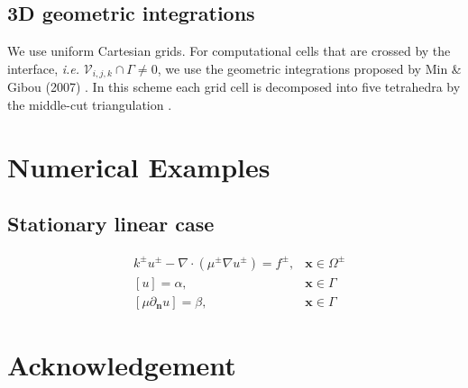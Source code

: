 \documentclass{elsarticle}
\begin{document}
\subsection{3D geometric integrations}
We use uniform Cartesian grids. For computational cells that are crossed by the interface, \textit{i.e.} $\mathcal{V}_{i,j,k}\cap \Gamma \neq 0$, we use the geometric integrations proposed by Min \& Gibou (2007) \cite{min2007geometric}. In this scheme each grid cell is decomposed into five tetrahedra by the middle-cut triangulation \cite{sallee1984middle}. 




\section{Numerical Examples}
\subsection{Stationary linear case}
\begin{align*}
&k^{\pm}u^{\pm} - \nabla \cdot (\mu^{\pm}\nabla u^\pm)=f^{\pm}, & \mathbf{x}\in\Omega^\pm\\
&[u]=\alpha, & \mathbf{x} \in \Gamma\\
&[\mu \partial_{\mathbf{n}}u]=\beta, & \mathbf{x} \in \Gamma
\end{align*}




\section*{Acknowledgement}



\newpage


\end{document}
